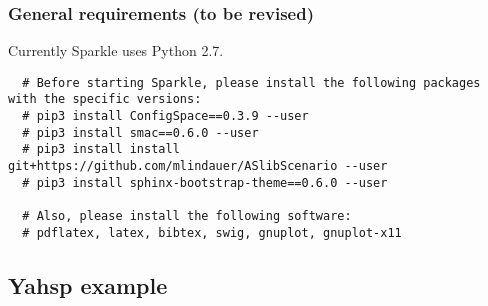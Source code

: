 \documentclass{article}
\begin{document}
\subsubsection{General requirements (to be revised)}

Currently Sparkle uses Python 2.7.

\begin{verbatim}
  # Before starting Sparkle, please install the following packages with the specific versions:
  # pip3 install ConfigSpace==0.3.9 --user
  # pip3 install smac==0.6.0 --user
  # pip3 install install git+https://github.com/mlindauer/ASlibScenario --user
  # pip3 install sphinx-bootstrap-theme==0.6.0 --user
  
  # Also, please install the following software:
  # pdflatex, latex, bibtex, swig, gnuplot, gnuplot-x11
\end{verbatim}

\subsection{Yahsp example}

\end{document}
